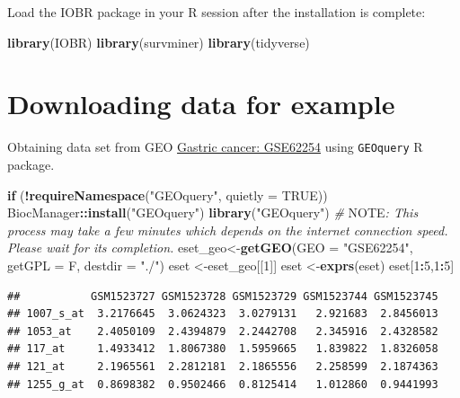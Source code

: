 \documentclass[
  12pt,
]{book}
\newenvironment{Shaded}{\begin{snugshade}}{\end{snugshade}}
\newcommand{\AlertTok}[1]{\textcolor[rgb]{0.94,0.16,0.16}{#1}}
\newcommand{\AttributeTok}[1]{\textcolor[rgb]{0.13,0.29,0.53}{#1}}
\newcommand{\CommentTok}[1]{\textcolor[rgb]{0.56,0.35,0.01}{\textit{#1}}}
\newcommand{\ConstantTok}[1]{\textcolor[rgb]{0.56,0.35,0.01}{#1}}
\newcommand{\ControlFlowTok}[1]{\textcolor[rgb]{0.13,0.29,0.53}{\textbf{#1}}}
\newcommand{\DecValTok}[1]{\textcolor[rgb]{0.00,0.00,0.81}{#1}}
\newcommand{\FunctionTok}[1]{\textcolor[rgb]{0.13,0.29,0.53}{\textbf{#1}}}
\newcommand{\NormalTok}[1]{#1}
\newcommand{\OtherTok}[1]{\textcolor[rgb]{0.56,0.35,0.01}{#1}}
\newcommand{\SpecialCharTok}[1]{\textcolor[rgb]{0.81,0.36,0.00}{\textbf{#1}}}
\newcommand{\StringTok}[1]{\textcolor[rgb]{0.31,0.60,0.02}{#1}}
\theoremstyle{definition}
\theoremstyle{definition}
\theoremstyle{definition}
\theoremstyle{definition}
\theoremstyle{remark}
\begin{document}
Load the IOBR package in your R session after the installation is complete:

\begin{Shaded}
\begin{Highlighting}[]
\FunctionTok{library}\NormalTok{(IOBR)}
\FunctionTok{library}\NormalTok{(survminer)}
\FunctionTok{library}\NormalTok{(tidyverse)}
\end{Highlighting}
\end{Shaded}

\hypertarget{downloading-data-for-example-2}{%
\section{Downloading data for example}\label{downloading-data-for-example-2}}

Obtaining data set from GEO \href{https://pubmed.ncbi.nlm.nih.gov/25894828/}{Gastric cancer: GSE62254} using \texttt{GEOquery} R package.

\begin{Shaded}
\begin{Highlighting}[]
\ControlFlowTok{if}\NormalTok{ (}\SpecialCharTok{!}\FunctionTok{requireNamespace}\NormalTok{(}\StringTok{"GEOquery"}\NormalTok{, }\AttributeTok{quietly =} \ConstantTok{TRUE}\NormalTok{))  BiocManager}\SpecialCharTok{::}\FunctionTok{install}\NormalTok{(}\StringTok{"GEOquery"}\NormalTok{)}
\FunctionTok{library}\NormalTok{(}\StringTok{"GEOquery"}\NormalTok{)}
\CommentTok{\# }\AlertTok{NOTE}\CommentTok{: This process may take a few minutes which depends on the internet connection speed. Please wait for its completion.}
\NormalTok{eset\_geo}\OtherTok{\textless{}{-}}\FunctionTok{getGEO}\NormalTok{(}\AttributeTok{GEO     =} \StringTok{"GSE62254"}\NormalTok{, }\AttributeTok{getGPL  =}\NormalTok{ F, }\AttributeTok{destdir =} \StringTok{"./"}\NormalTok{)}
\NormalTok{eset    }\OtherTok{\textless{}{-}}\NormalTok{eset\_geo[[}\DecValTok{1}\NormalTok{]]}
\NormalTok{eset    }\OtherTok{\textless{}{-}}\FunctionTok{exprs}\NormalTok{(eset)}
\NormalTok{eset[}\DecValTok{1}\SpecialCharTok{:}\DecValTok{5}\NormalTok{,}\DecValTok{1}\SpecialCharTok{:}\DecValTok{5}\NormalTok{]}
\end{Highlighting}
\end{Shaded}

\begin{verbatim}
##           GSM1523727 GSM1523728 GSM1523729 GSM1523744 GSM1523745
## 1007_s_at  3.2176645  3.0624323  3.0279131   2.921683  2.8456013
## 1053_at    2.4050109  2.4394879  2.2442708   2.345916  2.4328582
## 117_at     1.4933412  1.8067380  1.5959665   1.839822  1.8326058
## 121_at     2.1965561  2.2812181  2.1865556   2.258599  2.1874363
## 1255_g_at  0.8698382  0.9502466  0.8125414   1.012860  0.9441993
\end{verbatim}
\end{document}
